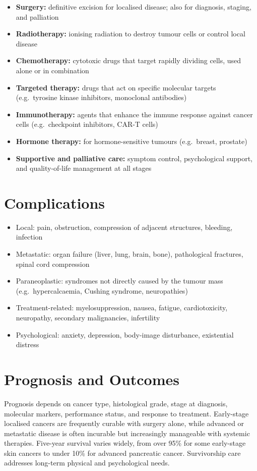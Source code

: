 \begin{itemize}
    \item \textbf{Surgery:} definitive excision for localised disease; also for diagnosis, staging, and palliation
    \item \textbf{Radiotherapy:} ionising radiation to destroy tumour cells or control local disease
    \item \textbf{Chemotherapy:} cytotoxic drugs that target rapidly dividing cells, used alone or in combination
    \item \textbf{Targeted therapy:} drugs that act on specific molecular targets (e.g.\ tyrosine kinase inhibitors, monoclonal antibodies)
    \item \textbf{Immunotherapy:} agents that enhance the immune response against cancer cells (e.g.\ checkpoint inhibitors, CAR-T cells)
    \item \textbf{Hormone therapy:} for hormone-sensitive tumours (e.g.\ breast, prostate)
    \item \textbf{Supportive and palliative care:} symptom control, psychological support, and quality-of-life management at all stages
\end{itemize}

\section*{Complications}
\begin{itemize}
    \item Local: pain, obstruction, compression of adjacent structures, bleeding, infection
    \item Metastatic: organ failure (liver, lung, brain, bone), pathological fractures, spinal cord compression
    \item Paraneoplastic: syndromes not directly caused by the tumour mass (e.g.\ hypercalcaemia, Cushing syndrome, neuropathies)
    \item Treatment-related: myelosuppression, nausea, fatigue, cardiotoxicity, neuropathy, secondary malignancies, infertility
    \item Psychological: anxiety, depression, body-image disturbance, existential distress
\end{itemize}

\section*{Prognosis and Outcomes}
Prognosis depends on cancer type, histological grade, stage at diagnosis, molecular markers, performance status, and response to treatment. Early-stage localised cancers are frequently curable with surgery alone, while advanced or metastatic disease is often incurable but increasingly manageable with systemic therapies. Five-year survival varies widely, from over 95\% for some early-stage skin cancers to under 10\% for advanced pancreatic cancer. Survivorship care addresses long-term physical and psychological needs.


